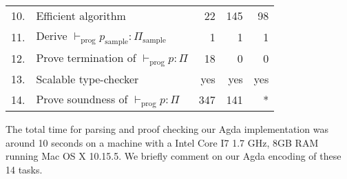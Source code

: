 \documentclass[sigconf]{acmart}
\theoremstyle{definition}
\begin{document}
\begin{table}[!htb]
\begin{tabular}{rl|rrr}
10. & Efficient algorithm                          & 22                        & 145                     & 98                       \\
11. & Derive $\vdash_{\textrm{prog}} p_{\textrm{sample}} : \Pi_{\textrm{sample}}$
                                                   & 1                         & 1                       & 1                        \\
12. & Prove termination of $\vdash_{\textrm{prog}} p : \Pi$
                                                   & 18                        & 0                       & 0                        \\
13. & Scalable type-checker                        & yes                       & yes                     & yes                      \\
14. & Prove soundness of $\vdash_{\textrm{prog}} p : \Pi$
                                                   & 347                       & 141                     & * 
\end{tabular}
\end{table}

The total time for parsing and proof checking our Agda implementation was around 10 seconds 
on a machine with a Intel Core I7 1.7 GHz, 8GB RAM running Mac OS X 10.15.5. We briefly comment 
on our Agda encoding of these 14 tasks.
\end{document}
